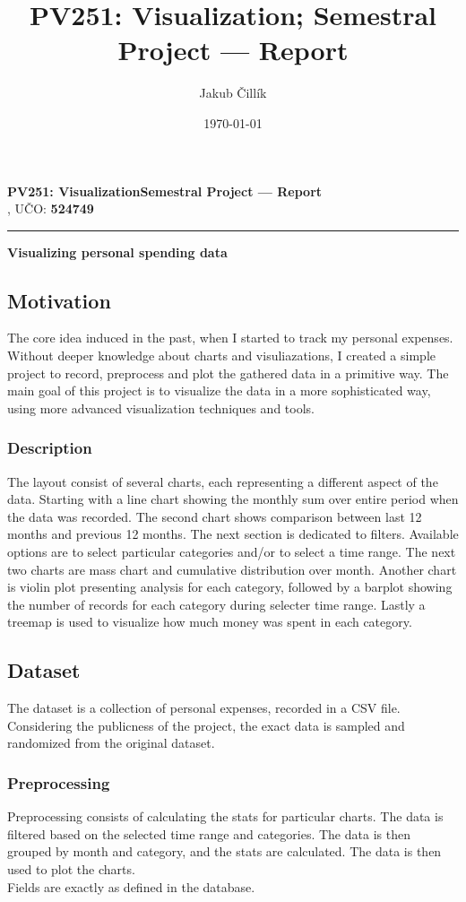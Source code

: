 \documentclass{article}
\title{PV251: Visualization; Semestral Project --- Report}
\author{Jakub Čillík}
\date{\today}
\begin{document}
    \noindent
    \textbf{PV251: Visualization}\hfill\textbf{Semestral Project --- Report}\\
    \@author, UČO: \textbf{524749}
    \vspace{0.5em}
    \hrule

    \vspace{1.5em}
    \noindent
    {\huge \textbf{Visualizing personal spending data}}

    \subsection*{Motivation}
        The core idea induced in the past, when I started to track my personal expenses. Without deeper knowledge about charts and visuliazations, I created a simple project to record, preprocess and plot the gathered data in a primitive way. The main goal of this project is to visualize the data in a more sophisticated way, using more advanced visualization techniques and tools.

        \subsubsection*{Description}
            The layout consist of several charts, each representing a different aspect of the data. Starting with a line chart showing the monthly sum over entire period when the data was recorded. The second chart shows comparison between last 12 months and previous 12 months.
            The next section is dedicated to filters. Available options are to select particular categories and/or to select a time range. The next two charts are mass chart and cumulative distribution over month. Another chart is violin plot presenting analysis for each category, followed by a barplot showing the number of records for each category during selecter time range. Lastly a treemap is used to visualize how much money was spent in each category.
    
    \subsection*{Dataset}
        The dataset is a collection of personal expenses, recorded in a CSV file. Considering the publicness of the project, the exact data is sampled and randomized from the original dataset.

        \subsubsection*{Preprocessing}
            Preprocessing consists of calculating the stats for particular charts. The data is filtered based on the selected time range and categories. The data is then grouped by month and category, and the stats are calculated. The data is then used to plot the charts.\\[1em]
            Fields are exactly as defined in the database.
    
\end{document}
